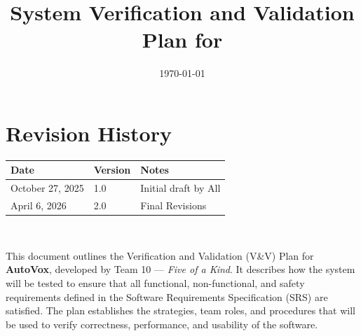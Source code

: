 \documentclass[12pt, titlepage]{article}
\begin{document}
\title{System Verification and Validation Plan for \progname{}} 
\author{\authname}
\date{\today}
	
\maketitle


\section*{Revision History}

\begin{tabularx}{\textwidth}{p{3cm}p{2cm}X}
\toprule {\bf Date} & {\bf Version} & {\bf Notes}\\
\midrule
October 27, 2025 & 1.0 & Initial draft by All\\
April 6, 2026 & 2.0 & Final Revisions\\
\bottomrule
\end{tabularx}

~\\

\newpage

\tableofcontents

\newpage

\listoftables

\newpage


\noindent This document outlines the Verification and Validation (V\&V) Plan for \textbf{AutoVox}, developed by Team 10 --- \textit{Five of a Kind}. It describes how the system will be tested to ensure that all functional, non-functional, and safety requirements defined in the Software Requirements Specification (SRS) are satisfied. The plan establishes the strategies, team roles, and procedures that will be used to verify correctness, performance, and usability of the software.\\
\end{document}
